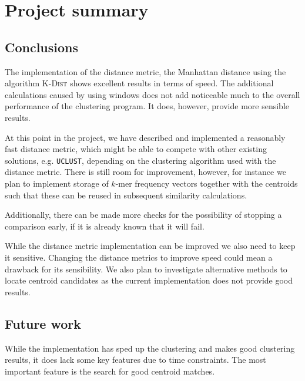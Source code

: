 \section{Project summary}

\subsection{Conclusions}
\label{sec:conclusions}

The implementation of the distance metric, the Manhattan distance using the
algorithm \textsc{K-Dist} shows excellent results in terms of speed. The
additional calculations caused by using windows does not add noticeable much
to the overall performance of the clustering program. It does, however,
provide more sensible results.

At this point in the project, we have described and implemented a reasonably
fast distance metric, which might be able to compete with other existing
solutions, e.g. \texttt{UCLUST}, depending on the clustering algorithm used
with the distance metric. There is still room for improvement, however, for
instance we plan to implement storage of $k$-mer frequency vectors together
with the centroids such that these can be reused in subsequent similarity
calculations.

Additionally, there can be made more checks for the possibility of stopping a
comparison early, if it is already known that it will fail.

While the distance metric implementation can be improved we also need to keep
it sensitive. Changing the distance metrics to improve speed could mean a
drawback for its sensibility. We also plan to investigate alternative methods
to locate centroid candidates as the current implementation does not provide
good results.

\subsection{Future work}
\label{sec:future_work}
While the implementation has sped up the clustering and makes good clustering results, it does lack some key features due to time constraints.
The most important feature is the search for good centroid matches. 


